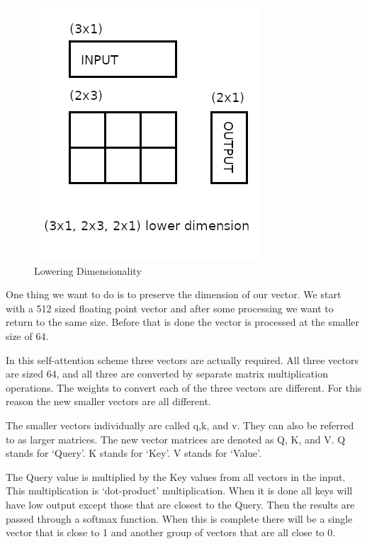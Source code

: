 \begin{figure}[H]
	\begin{center}
		
	
	\includegraphics[scale=0.5]{diagram-mat01}
\end{center}
	\caption[Lowering Dimensionality]{Lowering Dimensionality}
	
\end{figure}


One thing we want to do is to preserve the dimension of our vector. We start with a 512 sized floating point vector and after some processing we want to return to the same size. Before that is done the vector is processed at the smaller size of 64. 

In this self-attention scheme three vectors are actually required. All three vectors are sized 64, and all three are converted by separate matrix multiplication operations. The weights to convert each of the three vectors are different. For this reason the new smaller vectors are all different.

The smaller vectors individually are called q,k, and v. They can also be referred to as larger matrices. The new vector matrices are denoted as Q, K, and V. Q stands for `Query'. K stands for `Key'. V stands for `Value'. 

The Query value is multiplied by the Key values from all vectors in the input. This multiplication is `dot-product' multiplication. When it is done all keys will have low output except those that are closest to the Query. Then the results are passed through a softmax function. When this is complete there will be a single vector that is close to 1 and another group of vectors that are all close to 0.

